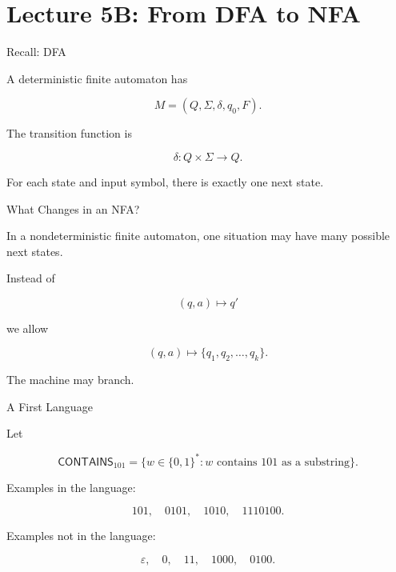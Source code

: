 \documentclass[10pt,aspectratio=169]{beamer}
\newcommand{\eps}{\varepsilon}
\newcommand{\lang}[1]{\mathsf{#1}}
\begin{document}
\section{Lecture 5B: From DFA to NFA}

\begin{frame}{Recall: DFA}

A deterministic finite automaton has

\[
M=(Q,\Sigma,\delta,q_0,F).
\]

\vspace{1em}

The transition function is

\[
\delta:Q\times\Sigma\rightarrow Q.
\]

\vspace{1em}

For each state and input symbol, there is exactly one next state.

\end{frame}

\begin{frame}{What Changes in an NFA?}

In a nondeterministic finite automaton, one situation may have many possible next states.

\vspace{1em}

Instead of

\[
(q,a)\longmapsto q'
\]

we allow

\[
(q,a)\longmapsto \{q_1,q_2,\ldots,q_k\}.
\]

\vspace{1em}

The machine may branch.

\end{frame}

\begin{frame}{A First Language}

Let

\[
\lang{CONTAINS}_{101}
=
\{w\in\{0,1\}^*: w \text{ contains }101\text{ as a substring}\}.
\]

\vspace{1em}

Examples in the language:

\[
101,\quad 0101,\quad 1010,\quad 1110100.
\]

Examples not in the language:

\[
\eps,\quad 0,\quad 11,\quad 1000,\quad 0100.
\]

\end{frame}
\end{document}
